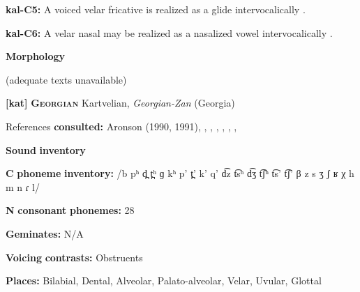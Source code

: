 \begin{styleBody}
\textbf{kal-C5:} A voiced velar fricative is realized as a glide intervocalically \citep[334]{Fortescue1984}.
\end{styleBody}

\begin{styleBody}
\textbf{kal-C6:} A velar nasal may be realized as a nasalized vowel intervocalically \citep[334]{Fortescue1984}.
\end{styleBody}

\begin{styleBody}
\textbf{Morphology}
\end{styleBody}

\begin{styleBody}
(adequate texts unavailable)
\end{styleBody}

\begin{styleBody}
\textbf{[kat]}   \textbf{\textsc{Georgian}}    Kartvelian, \textit{Georgian-Zan} (Georgia)
\end{styleBody}

\begin{styleBody}
References \textbf{consulted:} Aronson (1990, 1991), \citet{Chitoran1998}, \citet{Hewitt1995}, \citet{JunEtAl2006}, \citet{ShostedChikovani2006}, \citet{SkopeteasFéry2010}, \citet{Vicenek2010}, \citet{Vogt1958}
\end{styleBody}

\begin{styleBody}
\textbf{Sound} \textbf{inventory}
\end{styleBody}

\begin{styleBody}
\textbf{C} \textbf{phoneme} \textbf{inventory:} /b pʰ d̪ t̪ʰ ɡ kʰ p’ t̪’ k’ q’ d͡z t͡sʰ d͡ʒ t͡ʃʰ t͡s’ t͡ʃ’ β z s ʒ ʃ ʁ χ h m n ɾ l/
\end{styleBody}

\begin{styleBody}
\textbf{N} \textbf{consonant} \textbf{phonemes:} 28
\end{styleBody}

\begin{styleBody}
\textbf{Geminates:} N/A
\end{styleBody}

\begin{styleBody}
\textbf{Voicing} \textbf{contrasts:} Obstruents
\end{styleBody}

\begin{styleBody}
\textbf{Places:} Bilabial, Dental, Alveolar, Palato-alveolar, Velar, Uvular, Glottal
\end{styleBody}

